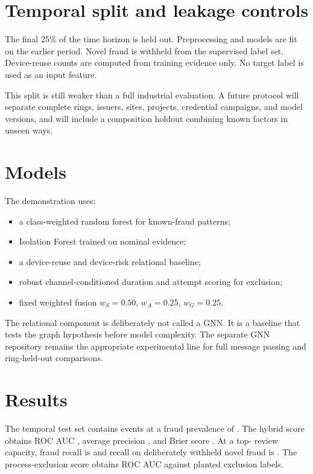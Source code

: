 \section{Temporal split and leakage controls}

The final 25\% of the time horizon is held out. Preprocessing and models are fit on the earlier period. Novel fraud is withheld from the supervised label set. Device-reuse counts are computed from training evidence only. No target label is used as an input feature.

This split is still weaker than a full industrial evaluation. A future protocol will separate complete rings, issuers, sites, projects, credential campaigns, and model versions, and will include a composition holdout combining known factors in unseen ways.

\section{Models}

The demonstration uses:

\begin{itemize}
\item a class-weighted random forest for known-fraud patterns;
\item Isolation Forest trained on nominal evidence;
\item a device-reuse and device-risk relational baseline;
\item robust channel-conditioned duration and attempt scoring for exclusion;
\item fixed weighted fusion $w_S=0.50$, $w_A=0.25$, $w_G=0.25$.
\end{itemize}

The relational component is deliberately not called a GNN. It is a baseline that tests the graph hypothesis before model complexity. The separate GNN repository remains the appropriate experimental line for full message passing and ring-held-out comparisons.

\section{Results}

The temporal test set contains \TestN{} events at a fraud prevalence of \FraudRate{}. The hybrid score obtains ROC AUC \RocAuc{}, average precision \AvgPrecision{}, and Brier score \Brier{}. At a top-\ReviewCapacity{} review capacity, fraud recall is \RecallCapacity{} and recall on deliberately withheld novel fraud is \NovelRecall{}. The process-exclusion score obtains ROC AUC \ExclusionAuc{} against planted exclusion labels.

